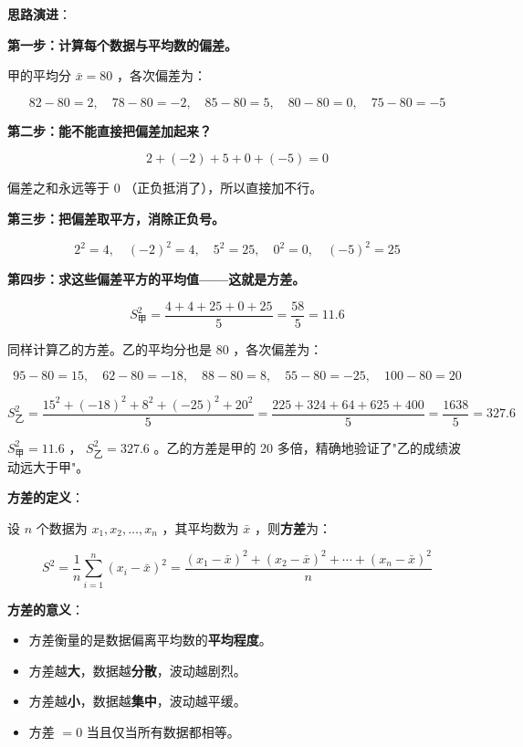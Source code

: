 \begin{understand}


\textbf{思路演进}：

\textbf{第一步：计算每个数据与平均数的偏差。}

甲的平均分 $\bar{x} = 80$ ，各次偏差为：

\[
82 - 80 = 2, \quad 78 - 80 = -2, \quad 85 - 80 = 5, \quad 80 - 80 = 0, \quad 75 - 80 = -5
\]


\textbf{第二步：能不能直接把偏差加起来？}

\[
2 + (-2) + 5 + 0 + (-5) = 0
\]


偏差之和永远等于 $0$ （正负抵消了），所以直接加不行。

\textbf{第三步：把偏差取平方，消除正负号。}

\[
2^2 = 4, \quad (-2)^2 = 4, \quad 5^2 = 25, \quad 0^2 = 0, \quad (-5)^2 = 25
\]


\textbf{第四步：求这些偏差平方的平均值——这就是方差。}

\[
S^2_{\text{甲}} = \frac{4 + 4 + 25 + 0 + 25}{5} = \frac{58}{5} = 11.6
\]


同样计算乙的方差。乙的平均分也是 $80$ ，各次偏差为：

\[
95 - 80 = 15, \quad 62 - 80 = -18, \quad 88 - 80 = 8, \quad 55 - 80 = -25, \quad 100 - 80 = 20
\]


\[
S^2_{\text{乙}} = \frac{15^2 + (-18)^2 + 8^2 + (-25)^2 + 20^2}{5} = \frac{225 + 324 + 64 + 625 + 400}{5} = \frac{1638}{5} = 327.6
\]


$S^2_{\text{甲}} = 11.6$ ， $S^2_{\text{乙}} = 327.6$ 。乙的方差是甲的 20 多倍，精确地验证了"乙的成绩波动远大于甲"。

\textbf{方差的定义}：

设 $n$ 个数据为 $x_1, x_2, \ldots, x_n$ ，其平均数为 $\bar{x}$ ，则\textbf{方差}为：

\[
S^2 = \frac{1}{n}\sum_{i=1}^{n}(x_i - \bar{x})^2 = \frac{(x_1 - \bar{x})^2 + (x_2 - \bar{x})^2 + \cdots + (x_n - \bar{x})^2}{n}
\]


\textbf{方差的意义}：
\begin{itemize}
  \item 方差衡量的是数据偏离平均数的\textbf{平均程度}。
  \item 方差越\textbf{大}，数据越\textbf{分散}，波动越剧烈。
  \item 方差越\textbf{小}，数据越\textbf{集中}，波动越平缓。
  \item 方差 $= 0$ 当且仅当所有数据都相等。
\end{itemize}


\end{understand}

